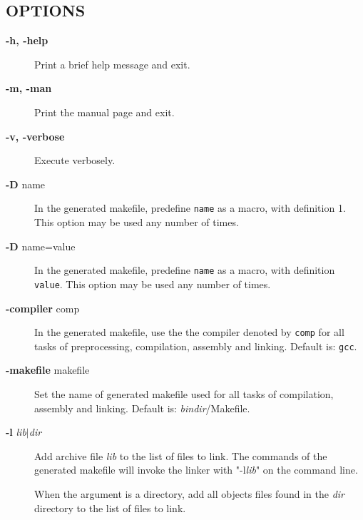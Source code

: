 \documentclass{article}
\begin{document}
\subsection*{OPTIONS\label{depend_OPTIONS}}
\begin{description}

\item[\textbf{-h, -help}] \mbox{}

Print a brief help message and exit.


\item[\textbf{-m, -man}] \mbox{}

Print the manual page and exit.


\item[\textbf{-v, -verbose}] \mbox{}

Execute verbosely.


\item[\textbf{-D} name] \mbox{}

In the generated makefile, predefine \texttt{name} as a macro,
with definition 1.
This option may be used any number of times.


\item[\textbf{-D} name=value] \mbox{}

In the generated makefile, predefine \texttt{name} as a macro,
with definition \texttt{value}.
This option may be used any number of times.


\item[\textbf{-compiler} comp] \mbox{}

In the generated makefile, use the
the compiler denoted by \texttt{comp} for all
tasks of preprocessing, compilation, assembly
and linking. Default is: \texttt{gcc}.


\item[\textbf{-makefile} makefile] \mbox{}

Set the name of generated makefile used for all
tasks of compilation, assembly and linking.
Default is: \emph{bindir}/Makefile.


\item[\textbf{-l} \emph{lib$|$dir}] \mbox{}

Add archive file \emph{lib} to the list of files to link.
The commands of the generated makefile will invoke
the linker with "-l\emph{lib}" on the command line.



When the argument is a directory, add all objects files found in the \emph{dir} directory
to the list of files to link.




\end{description}
\end{document}
